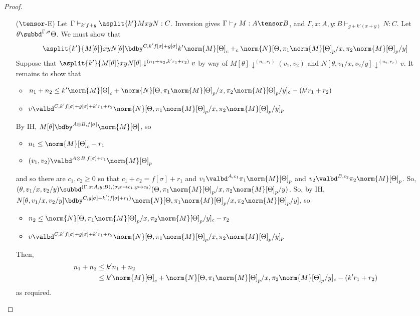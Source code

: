 \begin{proof}
\begin{itemize}
\item[($\tensor$-E)]
Let $\Gamma \vdash_{k'f + g} \asplit {k'} M x y N : C$. Inversion gives $\Gamma \vdash_f M : A \tensor B$, and $\Gamma,x : A, y : B \vdash_{g + k'(x + y)} N : C$. Let $\theta \subbd^{\Gamma,\sigma} \Theta$. We must show that
$$
\asplit {k'} {M[\theta]} x y {N[\theta]} \bdby^{C,k'f[\sigma] + g[\sigma]} k'\norm{M}[\Theta]_c +_c \norm{N}[\Theta,\pi_1\norm{M}[\Theta]_p/x,\pi_2\norm{M}[\Theta]_p/y]
$$
Suppose that $\asplit {k'} {M[\theta]} x y {N[\theta]} \downarrow^{(n_1 + n_2,k'r_1 + r_2)} v$ by way of $M[\theta] \downarrow^{(n_1,r_1)} (v_1,v_2)$ and $N[\theta,v_1/x,v_2/y] \downarrow^{(n_2,r_2)} v$. It remains to show that
\begin{itemize}
  \item $n_1 + n_2 \leq k'\norm{M}[\Theta]_c + \norm{N}[\Theta,\pi_1\norm{M}[\Theta]_p/x,\pi_2\norm{M}[\Theta]_p/y]_c - (k'r_1 + r_2)$
  \item $v \valbd^{C,k'f[\sigma] + g[\sigma] + k'r_1 + r_2} \norm{N}[\Theta,\pi_1\norm{M}[\Theta]_p/x,\pi_2\norm{M}[\Theta]_p/y]_p$
\end{itemize}
By IH, $M[\theta] \bdby^{A \otimes B,f[\sigma]} \norm{M}[\Theta]$, so
\begin{itemize}
  \item $n_1 \leq \norm{M}[\Theta]_c - r_1$
  \item $(v_1,v_2) \valbd^{A \otimes B,f[\sigma] + r_1} \norm{M}[\Theta]_p$
\end{itemize}
and so there are $c_1,c_2 \geq 0$ so that $c_1 + c_2 = f[\sigma] + r_1$ and $v_1 \valbd^{A,c_1} \pi_1\norm{M}[\Theta]_p$ and $v_2 \valbd^{B,c_2} \pi_2\norm{M}[\Theta]_p$. So, $(\theta,v_1/x,v_2/y) \subbd^{(\Gamma,x:A,y:B),(\sigma,x\mapsto c_1,y\mapsto c_2)} (\Theta,\pi_1\norm{M}[\Theta]_p/x,\pi_2\norm{M}[\Theta]_p/y)$. So, by IH,
$N[\theta,v_1/x,v_2/y] \bdby^{C,g[\sigma] + k'(f[\sigma] + r_1)} \norm{N}[\Theta,\pi_1\norm{M}[\Theta]_p/x,\pi_2\norm{M}[\Theta]_p/y]$, so
\begin{itemize}
  \item $n_2  \leq \norm{N}[\Theta,\pi_1\norm{M}[\Theta]_p/x,\pi_2\norm{M}[\Theta]_p/y]_c - r_2$
  \item $v \valbd^{C,k'f[\sigma] + g[\sigma] + k'r_1 + r_2} \norm{N}[\Theta,\pi_1\norm{M}[\Theta]_p/x,\pi_2\norm{M}[\Theta]_p/y]_p$
\end{itemize}
Then,
\begin{align*}
 n_1 + n_2 &\leq k'n_1 + n_2\\
 &\leq k'\norm{M}[\Theta]_c + \norm{N}[\Theta,\pi_1\norm{M}[\Theta]_p/x,\pi_2\norm{M}[\Theta]_p/y]_c - (k'r_1 + r_2)
\end{align*}
as required.


\end{itemize}
\end{proof}
